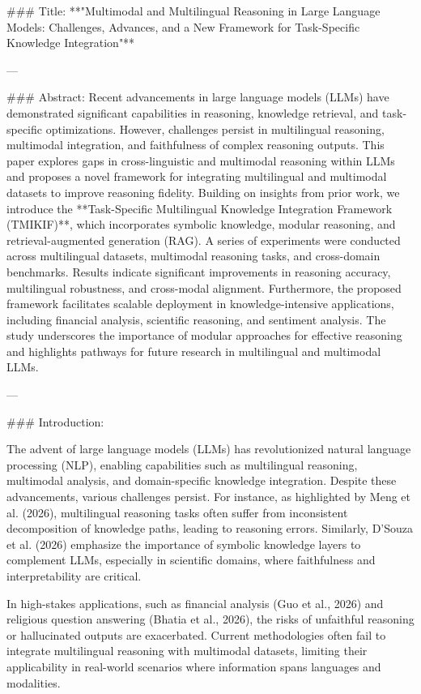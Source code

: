 ### Title:
**"Multimodal and Multilingual Reasoning in Large Language Models: Challenges, Advances, and a New Framework for Task-Specific Knowledge Integration"**

---

### Abstract:
Recent advancements in large language models (LLMs) have demonstrated significant capabilities in reasoning, knowledge retrieval, and task-specific optimizations. However, challenges persist in multilingual reasoning, multimodal integration, and faithfulness of complex reasoning outputs. This paper explores gaps in cross-linguistic and multimodal reasoning within LLMs and proposes a novel framework for integrating multilingual and multimodal datasets to improve reasoning fidelity. Building on insights from prior work, we introduce the **Task-Specific Multilingual Knowledge Integration Framework (TMIKIF)**, which incorporates symbolic knowledge, modular reasoning, and retrieval-augmented generation (RAG). A series of experiments were conducted across multilingual datasets, multimodal reasoning tasks, and cross-domain benchmarks. Results indicate significant improvements in reasoning accuracy, multilingual robustness, and cross-modal alignment. Furthermore, the proposed framework facilitates scalable deployment in knowledge-intensive applications, including financial analysis, scientific reasoning, and sentiment analysis. The study underscores the importance of modular approaches for effective reasoning and highlights pathways for future research in multilingual and multimodal LLMs.

---

### Introduction:

The advent of large language models (LLMs) has revolutionized natural language processing (NLP), enabling capabilities such as multilingual reasoning, multimodal analysis, and domain-specific knowledge integration. Despite these advancements, various challenges persist. For instance, as highlighted by Meng et al. (2026), multilingual reasoning tasks often suffer from inconsistent decomposition of knowledge paths, leading to reasoning errors. Similarly, D'Souza et al. (2026) emphasize the importance of symbolic knowledge layers to complement LLMs, especially in scientific domains, where faithfulness and interpretability are critical.

In high-stakes applications, such as financial analysis (Guo et al., 2026) and religious question answering (Bhatia et al., 2026), the risks of unfaithful reasoning or hallucinated outputs are exacerbated. Current methodologies often fail to integrate multilingual reasoning with multimodal datasets, limiting their applicability in real-world scenarios where information spans languages and modalities.

